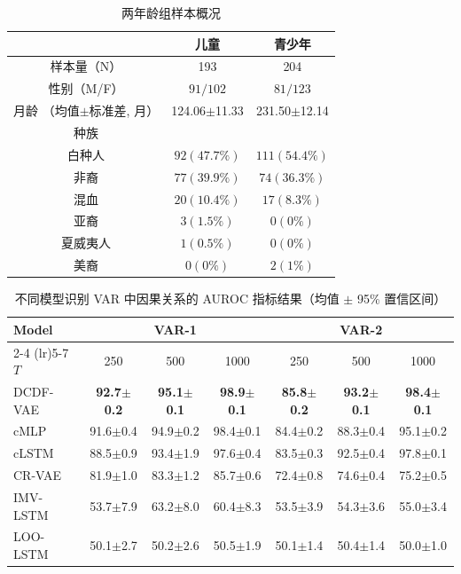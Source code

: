 
\begin{table}[h]
	\centering
	\caption{两年龄组样本概况}
	\label{tab:Subject}
	\begin{tabular}{ccc}
		\hline
		& 儿童 & 青少年 \\
		\hline
		样本量（N） & 193 & 204 \\
		性别（M/F） & $91 / 102$ & $81 / 123$ \\
		月龄 （均值$\pm$标准差, 月） & 124.06$\pm$11.33 & 231.50$\pm$12.14 \\
		\hline
		种族 & & \\
		白种人 & $92(47.7 \%)$ & $111(54.4 \%)$ \\
		非裔 & $77(39.9 \%)$ & $74(36.3 \%)$ \\
		混血 & $20(10.4 \%)$ & $17(8.3 \%)$ \\
		亚裔 & $3(1.5 \%)$ & $0(0 \%)$ \\
		夏威夷人 & $1(0.5 \%)$ & $0(0 \%)$ \\
		美裔 & $0(0 \%)$ & $2(1 \%)$ \\
		\hline
	\end{tabular}
\end{table}

\begin{table}[h]
  \centering
  \caption{不同模型识别 VAR 中因果关系的 AUROC 指标结果（均值 $\pm$ 95\% 置信区间）}
  \label{tab:var_results}
  \begin{tabular}{lcccccc}
    \toprule
    Model & \multicolumn{3}{c}{VAR-1} & \multicolumn{3}{c}{VAR-2} \\
    \cmidrule(lr){2-4} \cmidrule(lr){5-7}
    $T$ & 250 & 500 & 1000 & 250 & 500 & 1000 \\
    \midrule
    DCDF-VAE & \textbf{92.7$\pm$0.2} & \textbf{95.1$\pm$0.1} & \textbf{98.9$\pm$0.1} & \textbf{85.8$\pm$0.2} & \textbf{93.2$\pm$0.1} & \textbf{98.4$\pm$0.1} \\
    cMLP & 91.6$\pm$0.4 & 94.9$\pm$0.2 & 98.4$\pm$0.1 & 84.4$\pm$0.2 & 88.3$\pm$0.4 & 95.1$\pm$0.2 \\
    cLSTM & 88.5$\pm$0.9 & 93.4$\pm$1.9 & 97.6$\pm$0.4 & 83.5$\pm$0.3 & 92.5$\pm$0.4 & 97.8$\pm$0.1 \\
    CR-VAE & 81.9$\pm$1.0 & 83.3$\pm$1.2 & 85.7$\pm$0.6 & 72.4$\pm$0.8 & 74.6$\pm$0.4 & 75.2$\pm$0.5 \\
    IMV-LSTM & 53.7$\pm$7.9 & 63.2$\pm$8.0 & 60.4$\pm$8.3 & 53.5$\pm$3.9 & 54.3$\pm$3.6 & 55.0$\pm$3.4 \\
    LOO-LSTM & 50.1$\pm$2.7 & 50.2$\pm$2.6 & 50.5$\pm$1.9 & 50.1$\pm$1.4 & 50.4$\pm$1.4 & 50.0$\pm$1.0 \\
    \bottomrule
  \end{tabular}
\end{table}

